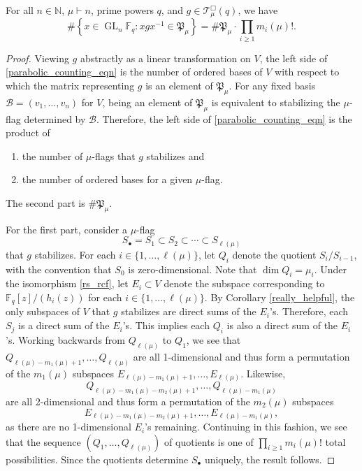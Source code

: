 \documentclass[Unicode,ALCO]{cedram}
\DeclareMathOperator{\GL}{GL}
\newcommand{\CB}{\mathcal{B}}
\newcommand{\F}{\mathbb{F}}
\newcommand{\N}{\mathbb{N}}
\newcommand{\CT}{\mathcal{T}}
\newcommand{\para}{\mathfrak{P}}
\begin{document}
\begin{lemma}
\label{parabolic_counting_lemma}
For all \(n \in \N\), $\mu \vdash n$, prime powers \(q\), and $g \in \CT_\mu^\Box (q)$, we have
\begin{equation} \label{parabolic_counting_eqn} \# \left \{ x \in \GL_n \F_q : xgx^{-1} \in \para_\mu \right \} = \# \para_\mu \cdot \prod_{i \geq 1} m_i(\mu)! .\end{equation}
\end{lemma}
\begin{proof}
Viewing \(g\) abstractly as a linear transformation on \(V\), the left side of \eqref{parabolic_counting_eqn} is the number of ordered bases of $V$ with respect to which the matrix representing $g$ is an element of $\para_\mu$.
For any fixed basis $\CB = (v_1,\ldots,v_{n})$ for $V$, being an element of $\para_\mu$ is equivalent to stabilizing the $\mu$-flag determined by $\CB$.
Therefore, the left side of \eqref{parabolic_counting_eqn} is the product of
\begin{enumerate}[(1)]
\item the number of $\mu$-flags that $g$ stabilizes and
\item the number of ordered bases for a given $\mu$-flag.
\end{enumerate}
The second part is $\# \para_\mu$.

For the first part, consider a $\mu$-flag
$$ S_\bullet = S_1 \subset S_2 \subset \cdots \subset S_{\ell(\mu)}$$
that $g$ stabilizes.
For each \(i \in \{1,\ldots,\ell(\mu)\}\), let \(Q_i\) denote the quotient \(S_i / S_{i-1}\), with the convention that \(S_0\) is zero-dimensional.
Note that \(\dim Q_i = \mu_i\).
Under the isomorphism \eqref{rs_rcf}, let \(E_i \subset V\) denote the subspace corresponding to \(\F_q[z] / (h_i(z))\) for each \(i \in \{1,\ldots,\ell(\mu)\}\).
By Corollary \ref{really_helpful}, the only subspaces of $V$ that $g$ stabilizes are direct sums of the $E_i$'s.
Therefore, each $S_j$ is a direct sum of the $E_i$'s.
This implies each $Q_i$ is also a direct sum of the $E_i$'s.
Working backwards from \(Q_{\ell(\mu)}\) to \(Q_1\), we see that
\(
Q_{\ell(\mu)-m_1(\mu)+1},
\ldots,
Q_{\ell(\mu)}
\) are all 1-dimensional
and thus form a permutation of the \(m_1(\mu)\) subspaces
\(
E_{\ell(\mu)-m_1(\mu)+1},
\ldots,
E_{\ell(\mu)}
\).
Likewise,
\[
Q_{\ell(\mu)-m_1(\mu)-m_2(\mu)+1},
\ldots,
Q_{\ell(\mu)-m_1(\mu)}
\]
are all 2-dimensional and thus form a permutation of the \(m_2(\mu)\) subspaces
\[
E_{\ell(\mu)-m_1(\mu)-m_2(\mu)+1},
\ldots,
E_{\ell(\mu)-m_1(\mu)},
\]
as there are no 1-dimensional \(E_i\)'s remaining.
Continuing in this fashion, we see that the sequence \((Q_1,\ldots,Q_{\ell(\mu)})\) of quotients is one of \(\prod_{i \geq 1} m_i(\mu)!\) total possibilities.
Since the quotients determine \(S_\bullet\) uniquely, the result follows.
\end{proof}
\end{document}
